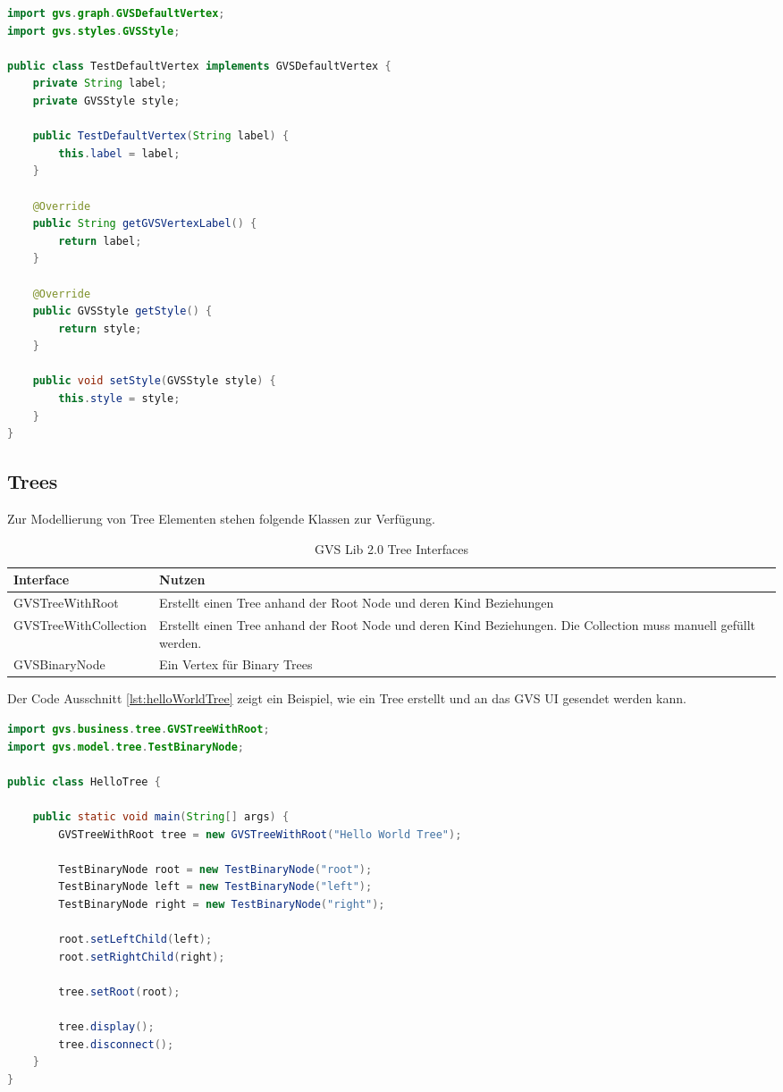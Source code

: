 \documentclass[11pt,a4paper,english,oneside]{book}
\numberwithin{equation}{chapter}
\begin{document}
\begin{lstlisting}[language=java, frame=single, caption={DefaultVertex Implementierung}, label={lst:vertex-impl}]
import gvs.graph.GVSDefaultVertex;
import gvs.styles.GVSStyle;

public class TestDefaultVertex implements GVSDefaultVertex {
	private String label;
	private GVSStyle style;
	
	public TestDefaultVertex(String label) {
		this.label = label;
	}
	
	@Override
	public String getGVSVertexLabel() {
		return label;
	}
	
	@Override
	public GVSStyle getStyle() {
		return style;
	}
	
	public void setStyle(GVSStyle style) {
		this.style = style;
	}
}
\end{lstlisting}

	\clearpage
	
	\subsection{Trees}
	Zur Modellierung von Tree Elementen stehen folgende Klassen zur Verfügung.
	
	\begin{table}[h!]
		\centering
		\begin{tabularx}{\linewidth}{l X}
			\toprule 
			Interface & Nutzen \\
			\midrule
			GVSTreeWithRoot & Erstellt einen Tree anhand der Root Node und deren Kind Beziehungen \\
			GVSTreeWithCollection & Erstellt einen Tree anhand der Root Node und deren Kind Beziehungen. Die Collection muss manuell gefüllt werden.  \\
			GVSBinaryNode & Ein Vertex für Binary Trees \\
			\bottomrule 
		\end{tabularx} 
		\caption{GVS Lib 2.0 Tree Interfaces} 
		\label{tbl:tree-interfaces}
	\end{table}
	
	Der Code Ausschnitt \ref{lst:helloWorldTree} zeigt ein Beispiel, wie ein Tree erstellt und an das GVS UI gesendet werden kann.
	
\begin{lstlisting}[language=java, frame=single, caption={Hello World Tree}, label={lst:helloWorldTree}]
import gvs.business.tree.GVSTreeWithRoot;
import gvs.model.tree.TestBinaryNode;

public class HelloTree {
	
	public static void main(String[] args) {
		GVSTreeWithRoot tree = new GVSTreeWithRoot("Hello World Tree");
		
		TestBinaryNode root = new TestBinaryNode("root");
		TestBinaryNode left = new TestBinaryNode("left");
		TestBinaryNode right = new TestBinaryNode("right");
		
		root.setLeftChild(left);
		root.setRightChild(right);
		
		tree.setRoot(root);
		
		tree.display();
		tree.disconnect();
	}
}

\end{lstlisting}
\end{document}
